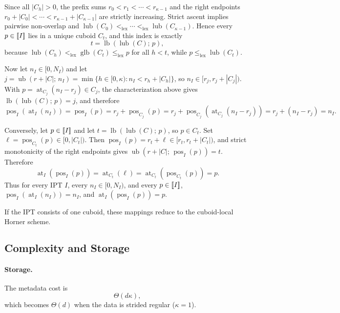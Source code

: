 \documentclass[manuscript,screen,review]{acmart}
\newcommand{\llbracket}{\mathopen{[\mkern-3mu[}}
\newcommand{\rrbracket}{\mathclose{]\mkern-3mu]}}
\theoremstyle{definition}
\theoremstyle{plain}
\begin{document}
Since all $|C_h|>0$, the prefix sums $r_0 < r_1 < \cdots < r_{\kappa-1}$ and the right endpoints $r_0+|C_0| < \cdots < r_{\kappa-1}+|C_{\kappa-1}|$ are strictly increasing. Strict ascent implies pairwise non-overlap and $\operatorname{lub}(C_0) <_{\mathrm{lex}} \cdots <_{\mathrm{lex}} \operatorname{lub}(C_{\kappa-1})$. Hence every $p \in \llbracket I \rrbracket$ lies in a unique cuboid $C_t$, and this index is exactly
\[
  t = \operatorname{lb}(\operatorname{lub}(C);\,p),
\]
because $\operatorname{lub}(C_h) <_{\mathrm{lex}} \operatorname{glb}(C_t) \le_{\mathrm{lex}} p$ for all $h < t$, while $p \le_{\mathrm{lex}} \operatorname{lub}(C_t)$.

Now let $n_I \in [0,N_I)$ and let
$
  j = \operatorname{ub}(r{+}|C|;\,n_I) = \min\{h \in [0,\kappa) : n_I < r_h + |C_h|\}$,
so $n_I \in [r_j, r_j + |C_j|)$. With $p = \operatorname{at}_{C_j}(n_I-r_j) \in C_j$, the characterization above gives $\operatorname{lb}(\operatorname{lub}(C);\,p)=j$, and therefore
\[
  \operatorname{pos}_I(\operatorname{at}_I(n_I)) = \operatorname{pos}_I(p)
  = r_j + \operatorname{pos}_{C_j}(p)
  = r_j + \operatorname{pos}_{C_j}(\operatorname{at}_{C_j}(n_I-r_j))
  = r_j + (n_I-r_j)
  = n_I.
\]

Conversely, let $p \in \llbracket I \rrbracket$ and let $t = \operatorname{lb}(\operatorname{lub}(C);\,p)$, so $p \in C_t$. Set $\ell = \operatorname{pos}_{C_t}(p) \in [0,|C_t|)$. Then
$
  \operatorname{pos}_I(p) = r_t + \ell \in [r_t, r_t + |C_t|)$,
and strict monotonicity of the right endpoints gives $\operatorname{ub}(r{+}|C|;\,\operatorname{pos}_I(p))=t$. Therefore
\[
  \operatorname{at}_I(\operatorname{pos}_I(p))
  = \operatorname{at}_{C_t}(\ell)
  = \operatorname{at}_{C_t}(\operatorname{pos}_{C_t}(p))
  = p.
\]
Thus for every IPT $I$, every $n_I \in [0,N_I)$, and every $p \in \llbracket I \rrbracket$,
$
  \operatorname{pos}_I(\operatorname{at}_I(n_I)) = n_I$,
  and   $\operatorname{at}_I(\operatorname{pos}_I(p)) = p
$.

If the IPT consists of one cuboid, these mappings reduce to the cuboid-local Horner scheme.

\subsection{Complexity and Storage}

\paragraph{Storage.}
The metadata cost is
\[
  \Theta(d\kappa),
\]
which becomes $\Theta(d)$ when the data is strided regular ($\kappa=1$).
\end{document}
